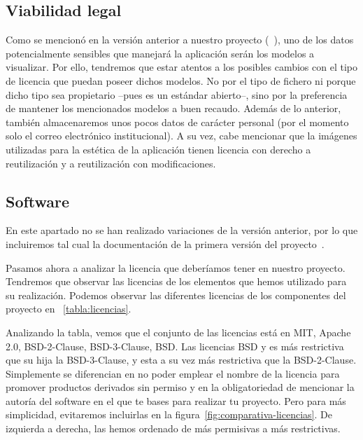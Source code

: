 \subsection{Viabilidad legal}
Como se mencionó en la versión anterior a nuestro proyecto (~\cite{github:alberto-viewer}), uno de los datos potencialmente sensibles que manejará la aplicación serán los modelos a visualizar. Por ello, tendremos que estar atentos a los posibles cambios con el tipo de licencia que puedan poseer dichos modelos. No por el tipo de fichero ni porque dicho tipo sea propietario --pues es un estándar abierto--, sino por la preferencia de mantener los mencionados modelos a buen recaudo. Además de lo anterior, también almacenaremos unos pocos datos de carácter personal (por el momento solo el correo electrónico institucional).
A su vez, cabe mencionar que la imágenes utilizadas para la estética de la aplicación tienen licencia con derecho a reutilización y a reutilización con modificaciones.

\subsection{Software}
En este apartado no se han realizado variaciones de la versión anterior, por lo que incluiremos tal cual la documentación de la primera versión del proyecto~\cite{github:alberto-viewer}.

Pasamos ahora a analizar la licencia que deberíamos tener en nuestro proyecto. Tendremos que observar las licencias de los elementos que hemos utilizado para su realización.
Podemos observar las diferentes licencias de los componentes del proyecto en ~\ref{tabla:licencias}.



Analizando la tabla, vemos que el conjunto de las licencias está en MIT, Apache 2.0, BSD-2-Clause, BSD-3-Clause, BSD. Las licencias BSD y es más restrictiva que su hija la BSD-3-Clause, y esta a su vez más restrictiva que la BSD-2-Clause. Simplemente se diferencian en no poder emplear el nombre de la licencia para promover productos derivados sin permiso y en la obligatoriedad de mencionar la autoría del software en el que te bases para realizar tu proyecto. Pero para más simplicidad, evitaremos incluirlas en la figura~\ref{fig:comparativa-licencias}. De izquierda a derecha, las hemos ordenado de más permisivas a más restrictivas.

